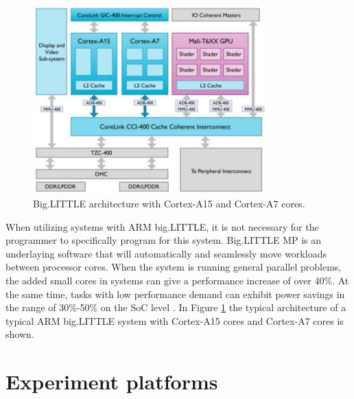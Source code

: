 \begin{figure}[H]
  \centering
  \includegraphics[width=90mm]{fig/biglittle.png}
  \caption{Big.LITTLE architecture with Cortex-A15 and Cortex-A7 cores. \label{bigLITTLEarchitecture}}
\end{figure}

When utilizing systems with ARM big.LITTLE, it is not necessary for the programmer to specifically program for this system.
Big.LITTLE MP is an underlaying software that will automatically and seamlessly move workloads between processor cores.
When the system is running general parallel problems, the added small cores in systems can give a performance increase of over 40\%.
At the same time, tasks with low performance demand can exhibit power savings in the range of 30\%-50\% on the SoC level \cite{jeff13}.
In Figure \ref{bigLITTLEarchitecture} the typical architecture of a typical ARM big.LITTLE system with Cortex-A15 cores and Cortex-A7 cores is shown.

\section{Experiment platforms}

